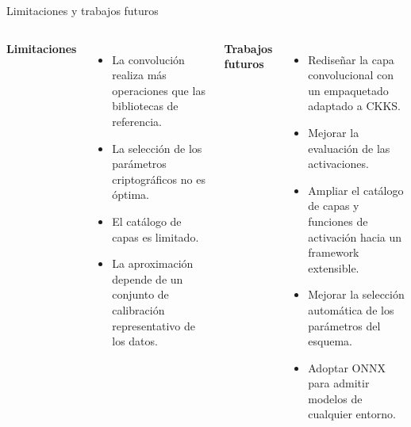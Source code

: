 \begin{frame}{Limitaciones y trabajos futuros}
    \begin{columns}[t]
        \textbf{Limitaciones}
        \begin{itemize}
            \setlength{\itemsep}{7pt}
            \item La convolución realiza más operaciones que las bibliotecas de referencia.
            \item La selección de los parámetros criptográficos no es óptima.
            \item El catálogo de capas es limitado.
            \item La aproximación depende de un conjunto de calibración representativo de los datos.
        \end{itemize}

        \textbf{Trabajos futuros}
        \begin{itemize}
            \setlength{\itemsep}{7pt}
            \item Rediseñar la capa convolucional con un empaquetado adaptado a CKKS.
            \item Mejorar la evaluación de las activaciones.
            \item Ampliar el catálogo de capas y funciones de activación hacia un framework extensible.
            \item Mejorar la selección automática de los parámetros del esquema.
            \item Adoptar ONNX para admitir modelos de cualquier entorno.
        \end{itemize}
    \end{columns}
\end{frame}
